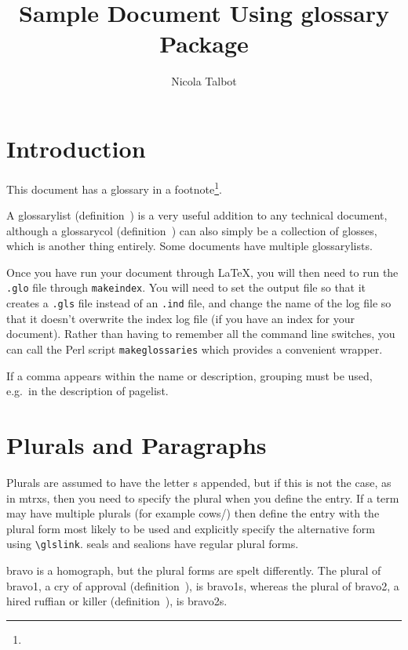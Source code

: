 \documentclass[a4paper]{report}
\begin{document}
\title{Sample Document Using glossary Package}
\author{Nicola Talbot}
\maketitle

\tableofcontents

\chapter{Introduction}

This document has a glossary in a footnote\footnote{\printglossaries}.

A \gls{glossarylist} (definition~) is a
very useful addition to any technical document, although a
\gls{glossarycol} (definition~) can also
simply be a collection of glosses, which is another thing entirely.
Some documents have multiple \glspl{glossarylist}.

Once you have run your document through \LaTeX, you
will then need to run the \texttt{.glo} file through
\texttt{makeindex}.  You will need to set the output
file so that it creates a \texttt{.gls} file instead
of an \texttt{.ind} file, and change the name of
the log file so that it doesn't overwrite the index
log file (if you have an index for your document).
Rather than having to remember all the command line
switches, you can call the \gls{Perl} script
\texttt{makeglossaries} which provides a convenient
wrapper.

If a comma appears within the name or description, grouping
must be used, e.g.\ in the description of \gls{pagelist}.

\chapter{Plurals and Paragraphs}

Plurals are assumed to have the letter s appended, but if this is
not the case, as in \glspl{mtrx}, then you need to specify the
plural when you define the entry. If a term may have multiple
plurals (for example \glspl{cow}/) then
define the entry with the plural form most likely to be used and
explicitly specify the alternative form using \verb|\glslink|.
\Glspl{seal} and \glspl{sealion} have regular plural forms.

\Gls{bravo} is a homograph, but the plural forms are spelt
differently. The plural of \gls{bravo1}, a cry of approval
(definition~), is \glspl{bravo1}, whereas the
plural of \gls{bravo2}, a hired ruffian or killer
(definition~), is \glspl{bravo2}.
\end{document}
